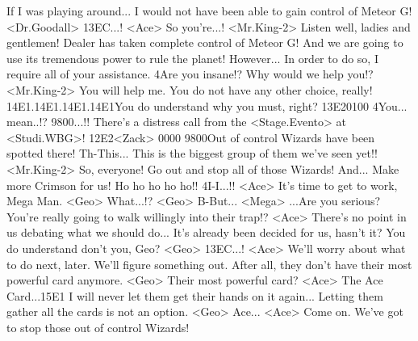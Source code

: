 If I was playing around... 
I would not have been able to gain control of Meteor G! 
<Dr.Goodall> {13}{EC}...! 
<Ace> So you're...! 
<Mr.King-2> Listen well, ladies and gentlemen! 
Dealer has taken complete control of Meteor G! 
And we are going to use its tremendous power to rule the planet! 
However... 
In order to do so, I require all of your assistance. 
4Are you insane!? Why would we help you!? 
<Mr.King-2> You will help me. 
You do not have any other choice, really! 
{14}{E1}.{14}{E1}.{14}{E1}.{14}{E1}You do understand why you must, right? 
{13}{E2}{01}{00} 
4You... mean..!? 
{98}{00}...!! 
There's a distress call from the <Stage.Evento> at <Studi.WBG>! 
{12}{E2}<Zack> {00}{00} 
{98}{00}Out of control Wizards have been spotted there! 
Th-This... This is the biggest group of them we've seen yet!! 
<Mr.King-2> So, everyone! 
Go out and stop all of those Wizards! 
And... 
Make more Crimson for us! 
Ho ho ho ho ho!! 
4I-I...!! 
<Ace> It's time to get to work, Mega Man. 
<Geo> What...!? 
<Geo> B-But... 
<Mega> ...Are you serious? 
You're really going to walk willingly into their trap!? 
<Ace> There's no point in us debating what we should do... 
It's already been decided for us, hasn't it? 
You do understand don't you, Geo? 
<Geo> {13}{EC}...! 
<Ace> We'll worry about what to do next, later. 
We'll figure something out. 
After all, they don't have their most powerful card anymore. 
<Geo> Their most powerful card? 
<Ace> The Ace Card...{15}{E1} I will never let them get their hands on it again... 
Letting them gather all the cards is not an option. 
<Geo> Ace... 
<Ace> Come on. 
We've got to stop those out of control Wizards! 
